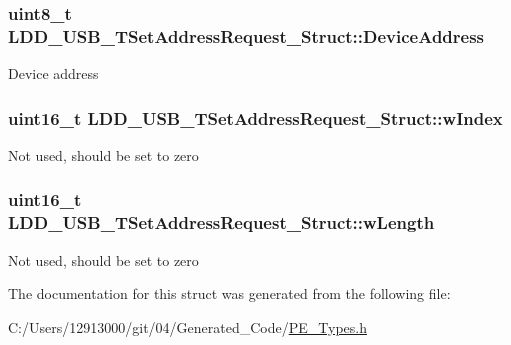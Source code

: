 \subsubsection[{Device\+Address}]{\setlength{\rightskip}{0pt plus 5cm}uint8\+\_\+t L\+D\+D\+\_\+\+U\+S\+B\+\_\+\+T\+Set\+Address\+Request\+\_\+\+Struct\+::\+Device\+Address}\label{struct_l_d_d___u_s_b___t_set_address_request___struct_ac55059f77c050ba97d5f0d9b2b3a52c9}
Device address \hypertarget{struct_l_d_d___u_s_b___t_set_address_request___struct_ab6a26adfbbc2e164679a4d7dcf5c99d0}{}
\subsubsection[{w\+Index}]{\setlength{\rightskip}{0pt plus 5cm}uint16\+\_\+t L\+D\+D\+\_\+\+U\+S\+B\+\_\+\+T\+Set\+Address\+Request\+\_\+\+Struct\+::w\+Index}\label{struct_l_d_d___u_s_b___t_set_address_request___struct_ab6a26adfbbc2e164679a4d7dcf5c99d0}
Not used, should be set to zero \hypertarget{struct_l_d_d___u_s_b___t_set_address_request___struct_adff24e6d3ec27fce1f59693aa215deda}{}
\subsubsection[{w\+Length}]{\setlength{\rightskip}{0pt plus 5cm}uint16\+\_\+t L\+D\+D\+\_\+\+U\+S\+B\+\_\+\+T\+Set\+Address\+Request\+\_\+\+Struct\+::w\+Length}\label{struct_l_d_d___u_s_b___t_set_address_request___struct_adff24e6d3ec27fce1f59693aa215deda}
Not used, should be set to zero 

The documentation for this struct was generated from the following file\+:\begin{DoxyCompactItemize}
\item 
C\+:/\+Users/12913000/git/04/\+Generated\+\_\+\+Code/\hyperlink{_p_e___types_8h}{P\+E\+\_\+\+Types.\+h}\end{DoxyCompactItemize}
